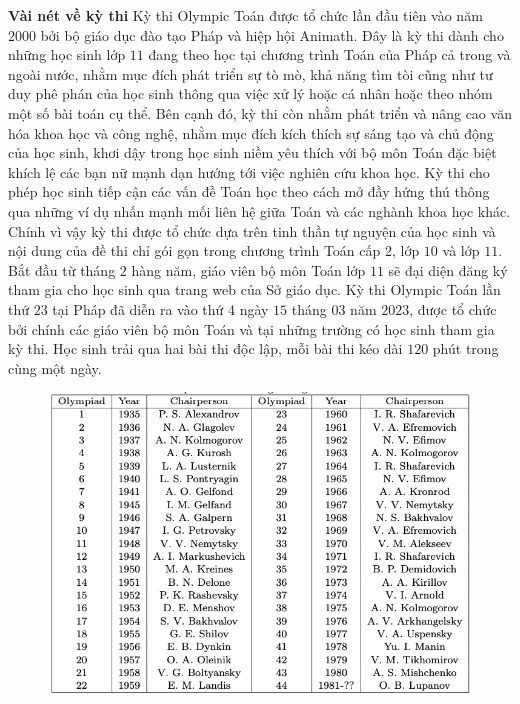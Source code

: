 \begin{multicols}{2}
	\textbf{\color{cackithi}Vài nét về kỳ thi}
	\vskip 0.1cm 
	Kỳ thi Olympic Toán được tổ chức lần đầu tiên vào năm $2000$ bởi bộ giáo dục đào tạo Pháp và hiệp hội Animath. Đây là kỳ thi dành cho những học sinh lớp $11$ đang theo học tại chương trình Toán của Pháp cả trong và ngoài nước, nhằm mục đích phát triển sự tò mò, khả năng tìm tòi cũng như tư duy phê phán của học sinh thông qua việc xử lý hoặc cá nhân hoặc theo nhóm một số bài toán cụ thể. Bên cạnh đó, kỳ thi còn nhằm phát triển và nâng cao văn hóa khoa học và công nghệ, nhằm mục đích kích thích sự sáng tạo và chủ động của học sinh, khơi dậy trong học sinh niềm yêu thích với bộ môn Toán đặc biệt khích lệ các bạn nữ mạnh dạn hướng tới việc nghiên cứu khoa học. Kỳ thi cho phép học sinh tiếp cận các vấn đề Toán học theo cách mở đầy hứng thú thông qua những ví dụ nhấn mạnh mối liên hệ giữa Toán và các nghành khoa học khác. Chính vì vậy kỳ thi được tổ chức dựa trên tinh thần tự nguyện của học sinh và nội dung của đề thi chỉ gói gọn trong chương trình Toán cấp $2$, lớp $10$ và lớp $11$. 
	\vskip 0.1cm
	Bắt đầu từ tháng $2$ hàng năm, giáo viên bộ môn Toán lớp $11$ sẽ đại diện đăng ký tham gia cho học sinh qua trang web của Sở giáo dục. Kỳ thi Olympic Toán lần thứ $23$ tại Pháp đã diễn ra vào thứ $4$ ngày $15$ tháng $03$ năm $2023$, được tổ chức bởi chính các giáo viên bộ môn Toán và tại những trường có học sinh tham gia kỳ thi. Học sinh trải qua hai bài thi độc lập, mỗi bài thi kéo dài $120$ phút trong cùng một ngày. 
	\begin{figure}[H]
		\vspace*{-7pt}
		\centering
		\captionsetup{labelformat= empty, justification=centering}
		\includegraphics[width= 1\linewidth]{1}

\end{figure}
\end{multicols}

